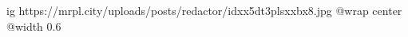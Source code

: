  
 
 
 
 

\ifcmt
  ig https://mrpl.city/uploads/posts/redactor/idxx5dt3plsxxbx8.jpg
  @wrap center
  @width 0.6
\fi
